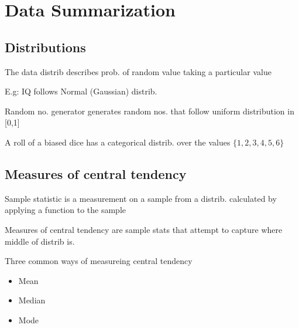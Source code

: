 \documentclass[a4paper]{article}
\begin{document}
\section{Data Summarization}
\subsection{Distributions}
The data distrib describes prob. of random value taking a particular value
\par E.g: IQ follows Normal (Gaussian) distrib.
\par Random no. generator generates random nos. that follow uniform distribution
in [0,1]
\par A roll of a biased dice has a categorical distrib. over the values
$\{1,2,3,4,5,6\} $
 \subsection{Measures of central tendency}
 Sample statistic is a measurement on a sample from a distrib. calculated by
 applying a function to the sample
 \par Measures of central tendency are sample stats that attempt to capture
 where middle of distrib is.
 \par Three common ways of measureing central tendency
 \begin{itemize}
 	\item Mean
	\item Median
	\item Mode
 \end{itemize}
\end{document}
